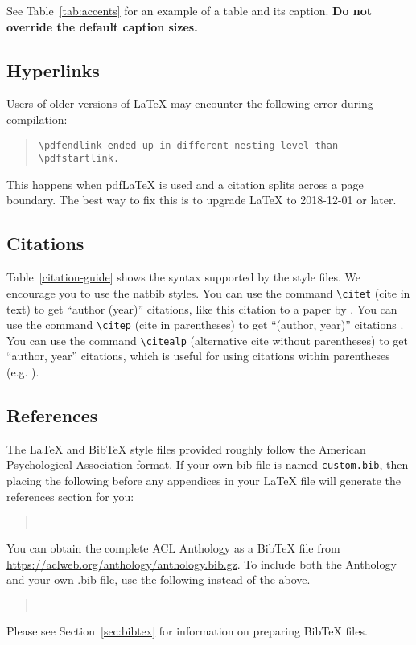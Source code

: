 \documentclass[11pt]{article}
\begin{document}
See Table~\ref{tab:accents} for an example of a table and its caption.
\textbf{Do not override the default caption sizes.}

\subsection{Hyperlinks}

Users of older versions of \LaTeX{} may encounter the following error during compilation: 
\begin{quote}
\tt\verb|\pdfendlink| ended up in different nesting level than \verb|\pdfstartlink|.
\end{quote}
This happens when pdf\LaTeX{} is used and a citation splits across a page boundary. The best way to fix this is to upgrade \LaTeX{} to 2018-12-01 or later.

\subsection{Citations}



Table~\ref{citation-guide} shows the syntax supported by the style files.
We encourage you to use the natbib styles.
You can use the command \verb|\citet| (cite in text) to get ``author (year)'' citations, like this citation to a paper by \citet{Gusfield:97}.
You can use the command \verb|\citep| (cite in parentheses) to get ``(author, year)'' citations \citep{Gusfield:97}.
You can use the command \verb|\citealp| (alternative cite without parentheses) to get ``author, year'' citations, which is useful for using citations within parentheses (e.g. \citealp{Gusfield:97}).

\subsection{References}

\nocite{Ando2005,augenstein-etal-2016-stance,andrew2007scalable,rasooli-tetrault-2015,goodman-etal-2016-noise,harper-2014-learning}

The \LaTeX{} and Bib\TeX{} style files provided roughly follow the American Psychological Association format.
If your own bib file is named \texttt{custom.bib}, then placing the following before any appendices in your \LaTeX{} file will generate the references section for you:
\begin{quote}
\begin{verbatim}


\end{verbatim}
\end{quote}
You can obtain the complete ACL Anthology as a Bib\TeX{} file from \url{https://aclweb.org/anthology/anthology.bib.gz}.
To include both the Anthology and your own .bib file, use the following instead of the above.
\begin{quote}
\begin{verbatim}


\end{verbatim}
\end{quote}
Please see Section~\ref{sec:bibtex} for information on preparing Bib\TeX{} files.
\end{document}
